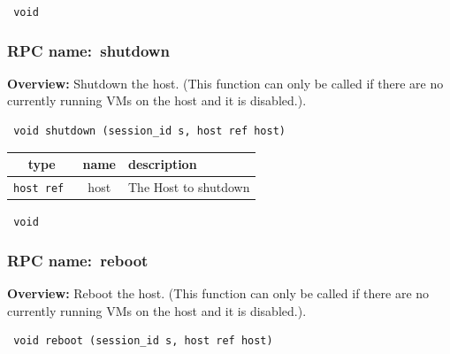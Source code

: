 \vspace{0.3cm}

{\tt 
void
}



\vspace{0.3cm}
\vspace{0.3cm}
\vspace{0.3cm}
\subsubsection{RPC name:~shutdown}

{\bf Overview:} 
Shutdown the host. (This function can only be called if there are no
currently running VMs on the host and it is disabled.).

\begin{verbatim} void shutdown (session_id s, host ref host)\end{verbatim}



 
\vspace{0.3cm}
\begin{tabular}{|c|c|p{7cm}|}
 \hline
{\bf type} & {\bf name} & {\bf description} \\ \hline
{\tt host ref } & host & The Host to shutdown \\ \hline 

\end{tabular}

\vspace{0.3cm}

{\tt 
void
}



\vspace{0.3cm}
\vspace{0.3cm}
\vspace{0.3cm}
\subsubsection{RPC name:~reboot}

{\bf Overview:} 
Reboot the host. (This function can only be called if there are no
currently running VMs on the host and it is disabled.).

\begin{verbatim} void reboot (session_id s, host ref host)\end{verbatim}



